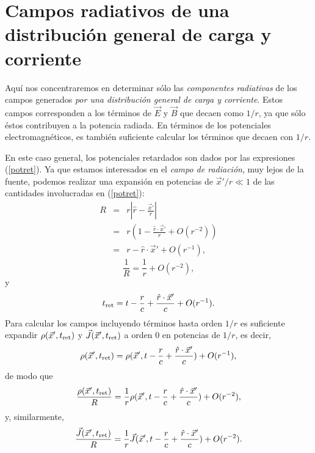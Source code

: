 \section{Campos radiativos de una distribución general de carga y corriente}

Aquí nos concentraremos en determinar sólo las \textit{componentes radiativas} de los campos generados \textit{por una distribución general de carga y corriente}. Estos campos corresponden a los términos de $\vec{E}$ y $\vec{B}$ que decaen como $1/r$, ya que sólo éstos contribuyen a la potencia radiada. En términos de los potenciales electromagnéticos, es también suficiente calcular los términos que decaen con $1/r$.

En este caso general, los potenciales retardados son dados por las expresiones (\ref{potret}). Ya que estamos interesados en el \textit{campo de radiación}, muy lejos de la fuente, podemos realizar una expansión en potencias de $\vec{x}'/r\ll 1$ de las cantidades involucradas en (\ref{potret}):
\begin{eqnarray}
 R&=&r\left|\hat{r}-\frac{\vec{x}'}{r}\right| \\
&=&r\left(1-\frac{\hat{r}\cdot\vec{x}'}{r}+O(r^{-2})\right) \\
&=& r-\hat{r}\cdot\vec{x}'+O(r^{-1}),
\end{eqnarray}
\begin{equation}
 \frac{1}{R}=\frac{1}{r}+O(r^{-2}),
\end{equation}
y
\begin{equation}
 t_{\rm ret}=t-\frac{r}{c}+\frac{\hat{r}\cdot\vec{x}'}{c}+O(r^{-1}).
\end{equation}
Para calcular los campos incluyendo términos hasta orden $1/r$ es suficiente expandir $\rho(\vec{x}',t_{\rm ret})$ y $\vec{J}(\vec{x}',t_{\rm ret})$ a orden 0 en potencias de $1/r$, es decir,
\begin{equation}
 \rho(\vec{x}',t_{\rm ret})=\rho(\vec{x}',t-\frac{r}{c}+\frac{\hat{r}\cdot\vec{x}'}{c})+O(r^{-1}),
\end{equation}
de modo que
\begin{equation}
 \frac{\rho(\vec{x}',t_{\rm ret})}{R}=\frac{1}{r}\rho(\vec{x}',t-\frac{r}{c}+\frac{\hat{r}\cdot\vec{x}'}{c})+O(r^{-2}),
\end{equation}
y, similarmente,
\begin{equation}
 \frac{\vec{J}(\vec{x}',t_{\rm ret})}{R}=\frac{1}{r}\vec{J}(\vec{x}',t-\frac{r}{c}+\frac{\hat{r}\cdot\vec{x}'}{c})+O(r^{-2}).
\end{equation}

